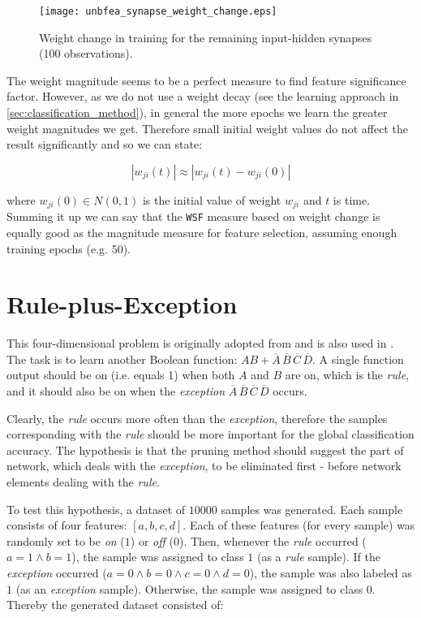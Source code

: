 \begin{figure}[H]
\centering
\texttt{[image: unbfea\_synapse\_weight\_change.eps]}
\caption{Weight change in training for the remaining input-hidden synapses (100 observations).}
\label{fig:examples:unbfea_synapse_weight_change}
\end{figure}

The weight magnitude seems to be a perfect measure to find feature significance factor. However, as we do not use a weight decay (see the learning approach in \cref{sec:classification_method}), in general the more epochs we learn the greater weight magnitudes we get. Therefore small initial weight values do not affect the result significantly and so we can state:

\begin{equation}
|w_{ji}(t)| \approx |w_{ji}(t) - w_{ji}(0)|
\end{equation}

where $ w_{ji}(0) \in N(0,1) $ is the initial value of weight $ w_{ji} $ and $ t $ is time. Summing it up we can say that the \texttt{WSF} measure based on weight change is equally good as the magnitude measure for feature selection, assuming enough training epochs (e.g. 50).

\section{Rule-plus-Exception} \label{sec:example_rpe}
This four-dimensional problem is originally adopted from \citep{mozer:skeletonization} and is also used in \citep{karnin:pa}. The task is to learn another Boolean function: $ AB+\overline{A} \, \overline{B} \, \overline{C} \, \overline{D} $. A single function output should be on (i.e. equals 1) when both $ A $ and $ B $ are on, which is the \textit{rule}, and it should also be on when the \textit{exception} $ \overline{A} \, \overline{B} \, \overline{C} \, \overline{D} $ occurs.

Clearly, the \textit{rule} occurs more often than the \textit{exception}, therefore the samples corresponding with the \textit{rule} should be more important for the global classification accuracy. The hypothesis is that the pruning method should suggest the part of network, which deals with the \textit{exception}, to be eliminated first - before network elements dealing with the \textit{rule}.

To test this hypothesis, a dataset of $ 10000 $ samples was generated. Each sample consists of four features: $ [a, b, c, d] $. Each of these features (for every sample) was randomly set to be \textit{on} ($ 1 $) or \textit{off} ($ 0 $). Then, whenever the \textit{rule} occurred ($ a = 1 \wedge b = 1 $), the sample was assigned to class $ 1 $ (as a \textit{rule} sample). If the \textit{exception} occurred ($ a = 0 \wedge b = 0 \wedge c = 0 \wedge d = 0 $), the sample was also labeled as $ 1 $ (as an \textit{exception} sample). Otherwise, the sample was assigned to class $ 0 $. Thereby the generated dataset consisted of:

